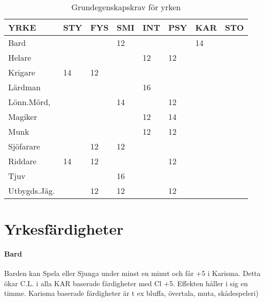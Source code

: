 \documentclass[a4paper, 10pt, titlepage]{article}
\begin{document}
\begin{table}[hbp]
  \caption{Grundegenskapskrav för yrken}
  \begin{tabular}{|l|l|l|l|l|l|l|l|}
    \hline
    YRKE         & STY     & FYS      & SMI     & INT    & PSY     & KAR     & STO  \\
    \hline
    Bard         & ~      & ~         & 12      & ~      & ~       & 14      & ~   \\
    \hline
    Helare       & ~      & ~         & ~       & 12     & 12      & ~       & ~   \\
    \hline
    Krigare      & 14     & 12        & ~       & ~      & ~       & ~       & ~   \\
    \hline
    Lärdman      & ~      & ~         & ~       & 16     & ~       & ~       & ~   \\
    \hline
    Lönn.Mörd,   & ~      & ~         & 14      & ~      & 12      & ~       & ~   \\
    \hline
    Magiker      & ~      & ~         & ~       & 12     & 14      & ~       & ~   \\
    \hline
    Munk         & ~      & ~         & ~       & 12     & 12      & ~       & ~   \\
    \hline
    Sjöfarare    & ~      & 12        & 12      & ~      & ~       & ~       & ~   \\
    \hline
    Riddare      & 14     & 12        & ~       & ~      & 12      & ~       & ~   \\
    \hline
    Tjuv         & ~      & ~         & 16      & ~      & ~       & ~       & ~   \\
    \hline
    Utbygds.Jäg. & ~      & 12        & 12      & ~      & 12      & ~       & ~   \\
    \hline
  \end{tabular}
\end{table}

\newpage
\section{Yrkesfärdigheter}

\paragraph{Bard} Barden kan Spela eller Sjunga under minst en minut och får +5 i Karisma.
Detta ökar C.L. i alla KAR baserade färdigheter med Cl +5. Effekten håller i sig en timme.
Karisma baserade färdigheter är t ex bluffa, övertala, muta, skådespeleri)
\end{document}
